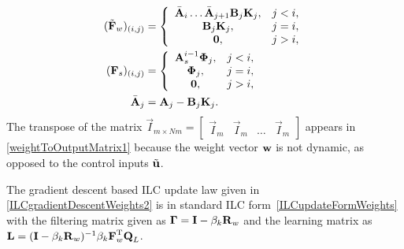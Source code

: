 \begin{equation}
\begin{aligned}
(\tilde{\boldsymbol{\mathrm{F}}}_{w})_{(i,j)} &= \left \{
\begin{array}{cc}
\bar{\boldsymbol{\mathrm{A}}}_{i}\ldots \bar{\boldsymbol{\mathrm{A}}}_{j+1}\boldsymbol{\mathrm{B}}_{j}\boldsymbol{\mathrm{K}}_{j}, & j < i, \\ 
\boldsymbol{\mathrm{B}}_{j}\boldsymbol{\mathrm{K}}_{j}, & j = i, \\
\boldsymbol{\mathrm{0}}, & j > i,  
\end{array} \right. \\
(\boldsymbol{\mathrm{F}}_{s})_{(i,j)} &= \left \{
\begin{array}{cc}
\boldsymbol{\mathrm{A}}_s^{i-1}\boldsymbol{\mathrm{\Phi}}_{j}, & j < i, \\ 
\boldsymbol{\mathrm{\Phi}}_{j}, & j = i, \\
\boldsymbol{\mathrm{0}}, & j > i,  
\end{array} \right. \\
\bar{\boldsymbol{\mathrm{A}}}_j &= \boldsymbol{\mathrm{A}}_j - \boldsymbol{\mathrm{B}}_j\boldsymbol{\mathrm{K}}_j. \\ 
\end{aligned}
\label{weightToOutputMatrix2}
\end{equation}
%
\noindent The transpose of the matrix $\vec{I}_{m\times Nm} = \begin{bmatrix}
  \vec{I}_{m} & \vec{I}_{m} & \ldots & \vec{I}_{m}
 \end{bmatrix}$ appears in \eqref{weightToOutputMatrix1} because the weight vector $\boldsymbol{\mathrm{w}}$ is not dynamic, as opposed to the control inputs $\tilde{\boldsymbol{\mathrm{u}}}$. 
 
The gradient descent based ILC update law given in \eqref{ILCgradientDescentWeights2} is in standard ILC form~\eqref{ILCupdateFormWeights} with the filtering matrix given as $\boldsymbol{\mathrm{\Gamma}} = \boldsymbol{\mathrm{I}} - \beta_k\boldsymbol{\mathrm{R}}_w$ and the learning matrix as $\boldsymbol{\mathrm{L}} = (\boldsymbol{\mathrm{I}} - \beta_k\boldsymbol{\mathrm{R}}_w)^{-1}\beta_k\boldsymbol{\mathrm{F}}_{w}^\mathrm{T}\boldsymbol{\mathrm{Q}}_L$.


